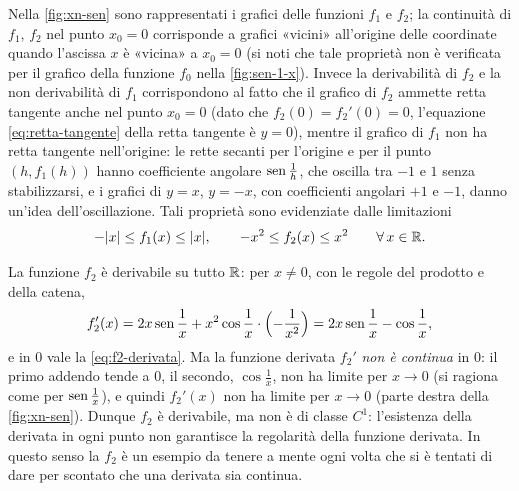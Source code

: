 Nella \cref{fig:xn-sen} sono rappresentati i grafici delle funzioni $f_{1}$ e $f_{2}$; la
continuità di $f_{1}$, $f_{2}$ nel punto $x_{0}=0$ corrisponde a grafici «vicini»
all'origine delle coordinate quando l'ascissa $x$ è «vicina» a $x_{0}=0$ (si noti che tale
proprietà non è verificata per il grafico della funzione $f_{0}$ nella
\cref{fig:sen-1-x}). Invece la derivabilità di $f_{2}$ e la non derivabilità di $f_{1}$
corrispondono al fatto che il grafico di $f_{2}$ ammette retta tangente anche nel punto
$x_{0}=0$ (dato che $f_{2}(0)=f_{2}'(0)=0$, l'equazione \eqref{eq:retta-tangente} della
retta tangente è $y=0$), mentre il grafico di $f_{1}$ non ha retta tangente nell'origine:
le rette secanti per l'origine e per il punto $(h,f_{1}(h))$ hanno coefficiente angolare
$\operatorname{sen}\frac1h$, che oscilla tra $-1$ e $1$ senza stabilizzarsi, e i grafici di $y=x$,
$y=-x$, con coefficienti angolari $+1$ e $-1$, danno un'idea dell'oscillazione. Tali
proprietà sono evidenziate dalle limitazioni
\begin{equation}\label{eq:f1-f2-limitazioni}
  -\lvert x\rvert\le f_{1}(x)\le\lvert x\rvert, \qquad -x^{2}\le f_{2}(x)\le x^{2} \qquad\forall\, x\in\mathbb{R} .
\end{equation}

\begin{osservazione}\label{oss:f2-non-C1}
La funzione $f_{2}$ è derivabile su tutto $\mathbb{R}$: per $x\neq0$, con le regole del prodotto e
della catena,
\[
  f_{2}'(x)=2x\operatorname{sen}\frac1x+x^{2}\cos\frac1x\cdot\Bigl(-\frac1{x^{2}}\Bigr)
  =2x\operatorname{sen}\frac1x-\cos\frac1x,
\]
e in $0$ vale la \eqref{eq:f2-derivata}. Ma la funzione derivata $f_{2}'$ \emph{non è
continua} in $0$: il primo addendo tende a $0$, il secondo, $\cos\frac1x$, non ha limite
per $x\to0$ (si ragiona come per $\operatorname{sen}\frac1x$), e quindi $f_{2}'(x)$ non ha limite per
$x\to0$ (parte destra della \cref{fig:xn-sen}). Dunque $f_{2}$ è derivabile, ma non è di
classe $C^{1}$: l'esistenza della derivata in ogni punto non garantisce la regolarità
della funzione derivata. In questo senso la $f_{2}$ è un esempio da tenere a mente ogni
volta che si è tentati di dare per scontato che una derivata sia continua.
\end{osservazione}

